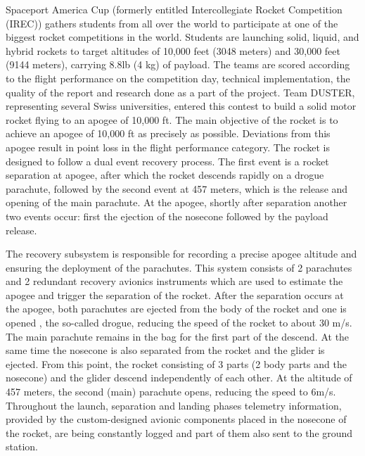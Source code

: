 \documentclass[]{iac}
\begin{document}

Spaceport America Cup (formerly entitled Intercollegiate Rocket Competition (IREC)) gathers students from all over the world to participate at one of the biggest rocket competitions in the world. Students are launching solid, liquid, and hybrid rockets to target altitudes of 10,000 feet (3048 meters) and 30,000 feet (9144 meters), carrying 8.8lb (4 kg) of payload. The teams are scored according to the flight performance on the competition day, technical implementation, the quality of the report and research done as a part of the project.
Team DUSTER, representing several Swiss universities, entered this contest to build a solid motor rocket flying to an apogee of 10,000 ft.
The main objective of the rocket is to achieve an apogee of 10,000 ft as precisely as possible. Deviations from this apogee result in point loss in the flight performance category.
The rocket is designed to follow a dual event recovery process. The first event is a rocket separation at apogee, after which the rocket descends rapidly on a drogue parachute, followed by the second event at 457 meters, which is the release and opening of the main parachute.
At the apogee, shortly after separation another two events occur: first the ejection of the nosecone followed by the payload release.

The recovery subsystem is responsible for recording 
a precise apogee altitude and ensuring the deployment of the parachutes. This system consists of 2 parachutes and 2 redundant recovery avionics instruments which are used to estimate the apogee and trigger the separation of the rocket. After the separation occurs at the apogee, both parachutes are ejected from the body of the rocket and one is opened , the so-called drogue, reducing the speed of the rocket to about 30 m/s. The main parachute remains in the bag for the first part of the descend. At the same time the nosecone is also separated from the rocket and the glider is ejected. From this point, the rocket consisting of 3 parts (2 body parts and the nosecone) and the glider descend independently of each other. At the altitude of 457 meters, the second (main) parachute opens, reducing the speed to 6m/s. Throughout the launch, separation and landing phases telemetry information, provided by the custom-designed avionic components placed in the nosecone of the rocket, are being constantly logged and part of them also sent to the ground station.
\end{document}
